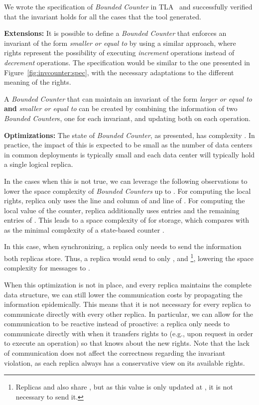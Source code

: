 \documentclass[conference]{IEEEtran}
\newcommand{\InvCounter}{\emph{Bounded Counter}}
\newcommand{\InvCounters}{\emph{Bounded Counters}}
\begin{document}
We wrote the specification of \InvCounter{} in TLA~\cite{tla} and 
successfully verified that the invariant holds for all the cases that the tool generated.

{\bf Extensions:}
It is possible to define a \InvCounter{} that enforces an invariant 
of the form \emph{smaller or equal to } by using a similar approach, 
where rights represent the possibility of executing \emph{increment} operations 
instead of \emph{decrement} operations. 
The specification would be similar to the one presented in 
Figure~\ref{fig:invcounter:spec}, with the necessary adaptations to the 
different meaning of the rights.

A \InvCounter{} that can maintain an invariant of the form 
\emph{larger or equal to } {\bf and} \emph{smaller or equal to } can 
be created by combining the information of two \InvCounter{}s, 
one for each invariant, and updating both on each operation.    



{\bf Optimizations:}
The state of \InvCounter{}, as presented, has complexity . 
In practice, the impact of this is expected to be small as the number of data
centers in common deployments is typically small and each data center will 
typically hold a single logical replica.

In the cases when this is not true, we can leverage the following observations to lower the
space complexity of \InvCounters{} up to .
For computing the local rights, replica  only uses the line  and column  of
 and line  of . 
For computing the local value of the counter, replica  
additionally uses entries  and the remaining entries of .
This leads to a space complexity of  for storage, which compares with  as the minimal
complexity of a state-based counter \cite{Burckhardt14Replicated}.


In this case, when synchronizing, a replica only needs to send the information both replicas
store. Thus, a replica  would send to  only , 
 and \footnote{Replicas  and  also share , but 
as this value is only updated at , it is not necessary to send it.}, 
lowering the space complexity for messages to .

When this optimization is not in place, and 
every replica maintains the complete data structure, we can still lower
the communication costs by propagating the information
epidemically. This means that it is not necessary for every replica to
communicate directly with every other replica.
In particular, we can allow for the communication to be reactive instead
of proactive: a replica  only needs to communicate directly with 
when it transfers rights to  (e.g., upon request in order to
execute an operation) so that 
knows about the new rights. Note that the lack of communication does
not affect the correctness regarding the invariant violation, as each replica 
always has a conservative view on its available rights. 
\end{document}
